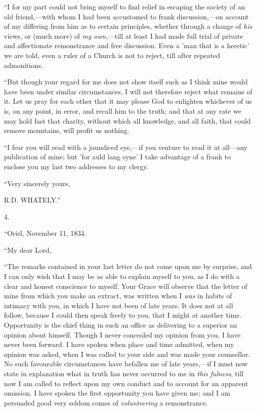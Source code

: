 ``I for my part could not bring myself to find
relief in escaping the society of an old friend,—with whom I had been
accustomed to frank discussion,—on account of my differing from him
as to certain principles, whether through a change of \emph{his} views, or
(much more) of \emph{my own},—till at least I had made full trial of
private and affectionate remonstrance and free discussion. Even a 'man
that is a heretic' we are told, even a ruler of a Church is not to
reject, till after repeated admonitions.

``But though your regard for me does not show itself
such as I think mine would have been under similar circumstances, I will
not therefore reject what remains of it. Let us pray for each other that
it may please God to enlighten whichever of us is, on any point, in
error, and recall him to the truth; and that at any rate we may hold
fast that charity, without which all knowledge, and all faith, that
could remove mountains, will profit us nothing.

``I fear you will read with a jaundiced
eye,—if you venture to read it at all—any publication of mine; but
'for auld lang syne' I take advantage of a frank to enclose you my last
two addresses to my clergy.

``Very sincerely yours,

R.D. WHATELY.''

4.

``Oriel, November 11, 1834.

``My dear Lord,

``The remarks contained in your last letter do not come upon me by
surprise, and I can only wish that I may be as able to explain myself to
you, as I do with a clear and honest conscience to myself. Your Grace
will observe that the letter of mine from which you make an extract, was
written when I \emph{was} in habits of intimacy with you, in which I have not
been of late years. It does not at all follow, because I could then
speak freely to you, that I might at another time. Opportunity is the
chief thing in such an office as delivering to a superior an opinion
about himself. Though I never concealed my opinion from you, I have
never been forward. I have spoken when place and time admitted, when my
opinion was asked, when I was called to your side and was made your
counsellor. No such favourable circumstances have befallen me of late
years,—if I must now state in explanation what in truth has never
occurred to me in \emph{this fulness}, till now I am called to reflect
upon my own conduct and to account for an apparent omission. I have
spoken the first opportunity you have given me; and I am persuaded good
very seldom comes of \emph{volunteering} a remonstrance.

